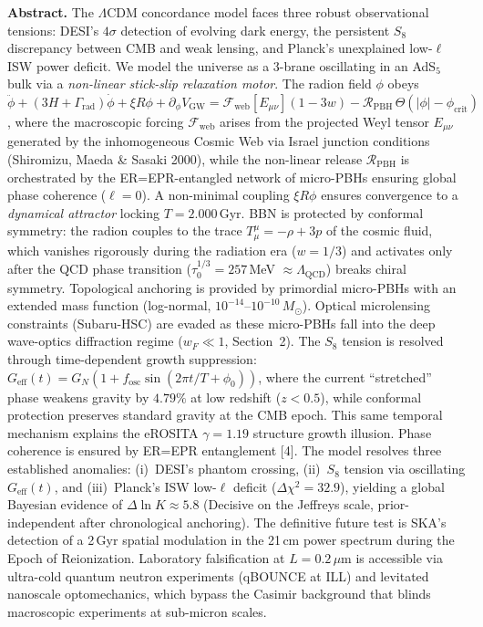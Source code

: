 \documentclass[11pt]{article}
\begin{document}
\noindent\textbf{Abstract.}
The $\Lambda$CDM concordance model faces three robust observational tensions: DESI's $4\sigma$ detection of evolving dark energy, the persistent $S_8$ discrepancy between CMB and weak lensing, and Planck's unexplained low-$\ell$ ISW power deficit. We model the universe as a 3-brane oscillating in an AdS$_5$ bulk via a \textit{non-linear stick-slip relaxation motor}. The radion field $\phi$ obeys $\ddot{\phi} + (3H{+}\Gamma_\text{rad})\dot{\phi} + \xi R\phi + \partial_\phi V_\text{GW} = \mathcal{F}_\text{web}[E_{\mu\nu}](1{-}3w) - \mathcal{R}_\text{PBH}\,\Theta(|\phi|-\phi_\text{crit})$, where the macroscopic forcing $\mathcal{F}_\text{web}$ arises from the projected Weyl tensor $E_{\mu\nu}$ generated by the inhomogeneous Cosmic Web via Israel junction conditions (Shiromizu, Maeda \& Sasaki 2000), while the non-linear release $\mathcal{R}_\text{PBH}$ is orchestrated by the ER=EPR-entangled network of micro-PBHs ensuring global phase coherence ($\ell=0$). A non-minimal coupling $\xi R\phi$ ensures convergence to a \textit{dynamical attractor} locking $T = 2.000$\,Gyr. BBN is protected by conformal symmetry: the radion couples to the trace $T^\mu_\mu = -\rho + 3p$ of the cosmic fluid, which vanishes rigorously during the radiation era ($w = 1/3$) and activates only after the QCD phase transition ($\tau_0^{1/3} = 257$\,MeV $\approx \Lambda_\text{QCD}$) breaks chiral symmetry. Topological anchoring is provided by primordial micro-PBHs with an extended mass function (log-normal, $10^{-14}$--$10^{-10}\,M_\odot$). Optical microlensing constraints (Subaru-HSC) are evaded as these micro-PBHs fall into the deep wave-optics diffraction regime ($w_F \ll 1$, Section~2). The $S_8$ tension is resolved through time-dependent growth suppression: $G_\text{eff}(t) = G_N\!\left(1 + f_\text{osc}\sin(2\pi t/T + \phi_0)\right)$, where the current ``stretched'' phase weakens gravity by $4.79\%$ at low redshift ($z < 0.5$), while conformal protection preserves standard gravity at the CMB epoch. This same temporal mechanism explains the eROSITA $\gamma = 1.19$ structure growth illusion. Phase coherence is ensured by ER=EPR entanglement [4]. The model resolves three established anomalies: (i)~DESI's phantom crossing, (ii)~$S_8$ tension via oscillating $G_\text{eff}(t)$, and (iii)~Planck's ISW low-$\ell$ deficit ($\Delta\chi^2 = 32.9$), yielding a global Bayesian evidence of $\Delta\ln K \approx 5.8$ (Decisive on the Jeffreys scale, prior-independent after chronological anchoring). The definitive future test is SKA's detection of a 2\,Gyr spatial modulation in the 21\,cm power spectrum during the Epoch of Reionization. Laboratory falsification at $L = 0.2\,\mu$m is accessible via ultra-cold quantum neutron experiments (qBOUNCE at ILL) and levitated nanoscale optomechanics, which bypass the Casimir background that blinds macroscopic experiments at sub-micron scales.
\end{document}
